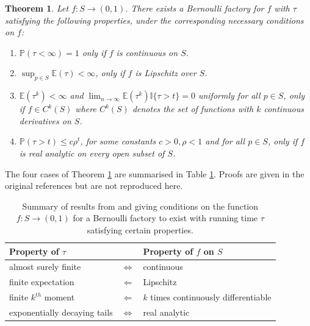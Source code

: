 \documentclass{article}
\newtheorem{thm}{Theorem}
\theoremstyle{definition}
\newcommand{\PR}{\mathbb{P}}
\newcommand{\E}{\mathbb{E}}
\begin{document}
\begin{thm}\label{thm:nacu_peres}
Let $f:S\to(0,1)$. 
There exists a Bernoulli factory for $f$ with $\tau$ satisfying the following properties, under the corresponding necessary conditions on $f$:
\begin{enumerate}[label=(\alph*)]
\item \label{thm:nplike_terminates_as} \textup{\citep{keane1994}} $\PR(\tau <\infty)=1$ only if $f$ is continuous on $S$.
\item \label{thm:np_finite_mean} \textup{\citep[Proposition 23]{nacu2005}} $\sup_{p\in S} \E(\tau) <\infty$, only if $f$ is Lipschitz over $S$. 
\item \label{thm:np_kth_moment} \textup{\citep[Proposition 22]{nacu2005}} $\E(\tau ^k)<\infty$ and $\lim_{n\to\infty} \E(\tau^k)\mathbb{I}\{\tau>t\} =0$ uniformly for all $p\in S$, only if $f\in C^k(S)$ where $C^k(S)$ denotes the set of functions with $k$ continuous derivatives on $S$.
\item \label{thm:np_exponential_tails} \textup{\citep[Theorem 2]{nacu2005}} $\PR(\tau >t) \leq c\rho^t$, for some constants $c>0, \rho<1$ and for all $p\in S$, only if $f$ is real analytic on every open subset of $S$. %
\end{enumerate}
\end{thm}
The four cases of Theorem \ref{thm:nacu_peres} are summarised in Table \ref{tab:theorems_summary}. Proofs are given in the original references but are not reproduced here.

\begin{table}
\centering
\begin{tabular}{l c l}
Property of $\tau$ & & Property of $f$ on $S$ \\
\hline
almost surely finite & $\Leftrightarrow$ & continuous \\
finite expectation & $\Leftarrow$ & Lipschitz \\
finite $k^{th}$ moment & $\Leftarrow$ & $k$ times continuously differentiable \\
exponentially decaying tails & $\Leftrightarrow$ & real analytic
\end{tabular}
\caption{Summary of results from \citet{keane1994} and \citet{nacu2005} giving conditions on the function $f:S\to(0,1)$ for a Bernoulli factory to exist with running time $\tau$ satisfying certain properties.}
\label{tab:theorems_summary}
\end{table}
\end{document}
